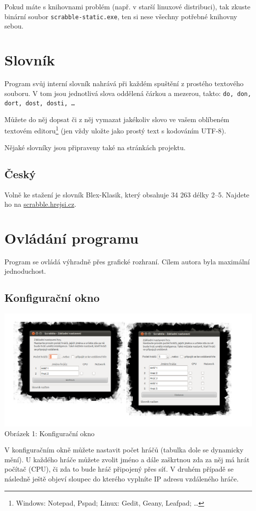 \documentclass[a4paper]{article}
\begin{document}
Pokud máte s knihovnami problém (např. v starší linuxové distribuci), tak zkuste binární soubor \texttt{scrabble-static.exe}, ten si nese všechny potřebné knihovny sebou.

\section{Slovník}
Program svůj interní slovník nahrává při každém spuštění z prostého textového souboru. V tom jsou jednotlivá slova oddělená čárkou a mezerou, takto:
\texttt{do, don, dort, dost, dosti, \ldots{}} 

Můžete do něj dopsat či z něj vymazat jakékoliv slovo ve vašem oblíbeném textovém editoru\footnote{Windows: Notepad, Pspad; Linux: Gedit, Geany, Leafpad; \ldots{}} (jen vždy uložte jako prostý text s kodováním UTF-8). 

Nějaké slovníky jsou připraveny také na stránkách projektu.

\subsection{Český}
Volně ke stažení je slovník Blex-Klasik, který obsahuje 34 263 délky 2--5. Najdete ho na \href{http://scrabble.hrejsi.cz/pravidla/blex.htm}{scrabble.hrejsi.cz}.

\section{Ovládání programu}
Program se ovládá výhradně přes grafické rozhraní. Cílem autora byla maximální jednoduchost.

\subsection{Konfigurační okno}
\begin{center}
\includegraphics[scale=1.2]{pic/configWin.png}
Obrázek 1: Konfigurační okno
\end{center}
V konfiguračním okně můžete nastavit počet hráčů (tabulka dole se dynamicky mění). U každého hráče můžete zvolit jméno a dále zaškrtnou zda za něj má hrát počítač (CPU), či zda to bude hráč připojený přes síť. V druhém případě se následně ještě objeví sloupec do kterého vyplníte IP adresu vzdáleného hráče. 
\end{document}
